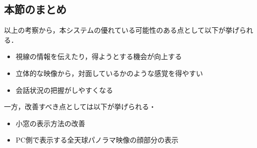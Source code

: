 \subsection*{本節のまとめ}
以上の考察から，本システムの優れている可能性のある点として以下が挙げられる．
\begin{itemize}
  \item 視線の情報を伝えたり，得ようとする機会が向上する
  \item 立体的な映像から，対面しているかのような感覚を得やすい
  \item 会話状況の把握がしやすくなる
\end{itemize}

一方，改善すべき点としては以下が挙げられる・
\begin{itemize}
  \item 小窓の表示方法の改善
  \item PC側で表示する全天球パノラマ映像の顔部分の表示
\end{itemize}













